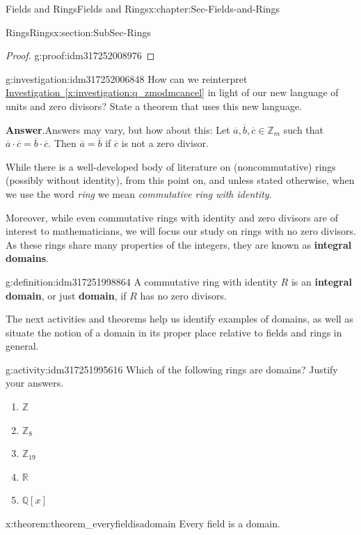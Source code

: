 \documentclass[oneside,10pt,]{book}
\newcommand{\blocktitlefont}{\relax}
\newcommand{\xreffont}{\relax}
\newcommand{\terminology}[1]{\textbf{#1}}
\numberwithin{equation}{section}
\def\Z{{\mathbb Z}}
\def\Q{{\mathbb Q}}
\def\R{{\mathbb R}}
\begin{document}
\begin{chapterptx}{Fields and Rings}{}{Fields and Rings}{}{}{x:chapter:Sec-Fields-and-Rings}
\begin{sectionptx}{Rings}{}{Rings}{}{}{x:section:SubSec-Rings}
\begin{proof}{}{g:proof:idm317252008976}
\end{proof}
\begin{investigation}{}{g:investigation:idm317252006848}%
How can we reinterpret \hyperref[x:investigation:q_zmodmcancel]{Investigation~{\xreffont\ref{x:investigation:q_zmodmcancel}}} in light of our new language of units and zero divisors? State a theorem that uses this new language.%
\par\smallskip%
\noindent\textbf{\blocktitlefont Answer}.\hypertarget{g:answer:idm317252003216}{}\quad{}Answers may vary, but how about this: Let \(\overline{a},\overline{b},\overline{c}\in \Z_m\) such that \(\overline{a}\cdot \overline{c} = \overline{b}\cdot \overline{c}\). Then \(\overline{a} = \overline{b}\) if \(\overline{c}\) is not a zero divisor.%
\end{investigation}
While there is a well-developed body of literature on (noncommutative) rings (possibly without identity), from this point on, and unless stated otherwise, when we use the word \emph{ring} we mean \emph{commutative ring with identity}.%
\par
Moreover, while even commutative rings with identity and zero divisors are of interest to mathematicians, we will focus our study on rings with no zero divisors. As these rings share many properties of the integers, they are known as \terminology{integral domains}.%
\begin{definition}{}{g:definition:idm317251998864}%
%
%
A commutative ring with identity \(R\) is an \terminology{integral domain}, or just \terminology{domain}, if \(R\) has no zero divisors.%
\end{definition}
The next activities and theorems help us identify examples of domains, as well as situate the notion of a domain in its proper place relative to fields and rings in general.%
\begin{activity}{}{g:activity:idm317251995616}%
Which of the following rings are domains? Justify your answers.%
\begin{enumerate}
\item{}\(\Z\)%
\item{}\(\Z_{8}\)%
\item{}\(\Z_{19}\)%
\item{}\(\R\)%
\item{}\(\Q[x]\)%
\end{enumerate}
%
\end{activity}
\begin{theorem}{}{}{x:theorem:theorem_everyfieldisadomain}%
Every field is a domain.%

\end{theorem}
\end{sectionptx}
\end{chapterptx}
\end{document}
